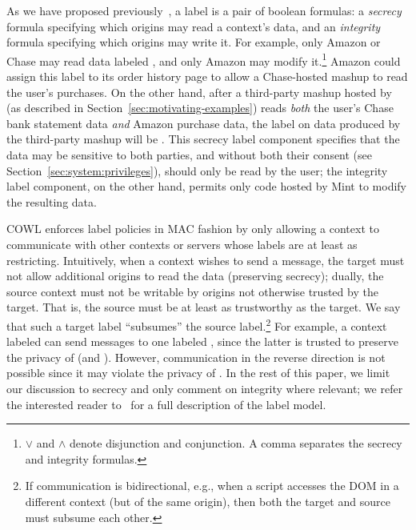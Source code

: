 As we have proposed previously~\cite{yang:2013:towards,
  stefan:2011:dclabels}, a label is a pair of boolean formulas: a
\emph{secrecy} formula specifying which origins may read a context's
data, and an \emph{integrity} formula specifying which origins may
write it.
%
For example, only Amazon or Chase may read data labeled
, and only Amazon may modify
it.\footnote{$\lor$ and $\land$ denote disjunction and conjunction. A
  comma separates the secrecy and integrity formulas.}
%
Amazon could assign this label to its order history page to allow a
Chase-hosted mashup to read the user's purchases.
%
On the other hand, after a third-party mashup hosted by
 (as described in
Section~\ref{sec:motivating-examples}) reads {\em both} the user's
Chase bank statement data {\em and} Amazon purchase data, the label on
data produced by the third-party mashup will be
.
%
This secrecy label component specifies that the data may be sensitive
to both parties, and without both their consent (see
Section~\ref{sec:system:privileges}), should only be read by the user;
the integrity label component, on the other hand, permits only code
hosted by Mint to modify the resulting data.
 
COWL enforces label policies in MAC fashion by only allowing a context
to communicate with other contexts or servers whose labels are at
least as restricting.
%
Intuitively, when a context wishes to send a message, the target must
not allow additional origins to read the data (preserving secrecy);
dually, the source context must not be writable by origins not
otherwise trusted by the target. That is, the source must be at least
as trustworthy as the target.
%
We say that such a target label ``subsumes'' the source
label.\footnote{ If communication is bidirectional, e.g., when a
  script accesses the DOM in a different context (but of the same
  origin), then both the target and source must subsume each other.}
%
For example, a context labeled
 can send messages to
one labeled , since the latter is trusted
to preserve the privacy of  (and
).
%
However, communication in the reverse direction is not possible since
it may violate the privacy of .
%
In the rest of this paper, we limit our discussion to secrecy and only
comment on integrity where relevant; we refer the interested reader
to~\cite{stefan:2011:dclabels} for a full description of the label
model.

